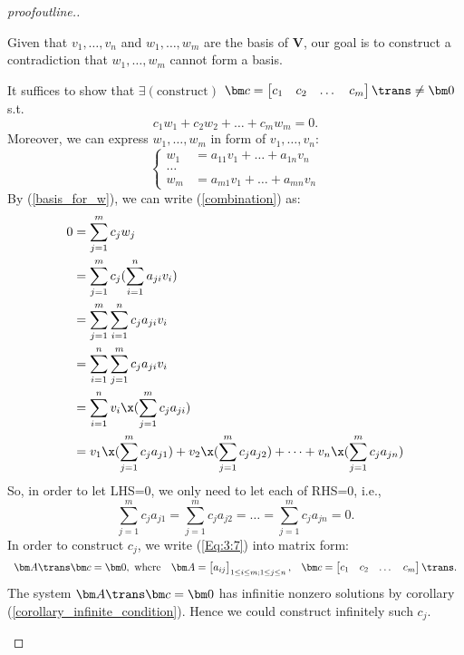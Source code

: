 \begin{proof}[proofoutline.]
\begin{enumerate}
Given that $v_1,\dots,v_n$ and $w_1,\dots,w_m$ are the basis of $\bm V$, our goal is to construct a contradiction that $w_1,\dots,w_m$ cannot form a basis.

It suffices to show that $\exists (\mbox{construct})$ $\bm c = \begin{bmatrix}
c_1&c_2&\dots&c_m
\end{bmatrix}\trans\ne\bm 0$ s.t.
\begin{equation}\label{combination}
c_1w_1+c_2w_2+\dots+c_mw_m = 0.
\end{equation}
Moreover, we can express $w_1,\dots,w_m$ in form of $v_1,\dots,v_n$:
\begin{equation}\label{basis_for_w}
\left\{\begin{aligned}
w_1 &= a_{11}v_1 +\dots+a_{1n}v_n\\
\dots\\
w_m &= a_{m1}v_1 +\dots + a_{mn}v_n
\end{aligned}\right.
\end{equation}
By (\ref{basis_for_w}), we can write (\ref{combination}) as:
\[
\begin{aligned}
0 &= \sum_{j=1}^{m}c_jw_j\\
  &= \sum_{j=1}^{m}c_j(\sum_{i=1}^{n}a_{ji}v_i)\\
  &= \sum_{j=1}^{m}\sum_{i=1}^{n}c_ja_{ji}v_i\\
  &= \sum_{i=1}^{n}\sum_{j=1}^{m}c_ja_{ji}v_i\\
  &= \sum_{i=1}^{n}v_i\x(\sum_{j=1}^{m}c_ja_{ji})\\
  &= v_1\x(\sum_{j=1}^{m}c_ja_{j1}) + v_2\x(\sum_{j=1}^{m}c_ja_{j2}) +\dots +v_n\x(\sum_{j=1}^{m}c_ja_{jn})
\end{aligned}
\]
So, in order to let LHS=0, we only need to let each of RHS=0, i.e., 
\begin{equation}
\sum_{j=1}^{m}c_ja_{j1} = \sum_{j=1}^{m}c_ja_{j2} = \dots = \sum_{j=1}^{m}c_ja_{jn} = 0.\label{Eq:3:7}
\end{equation}
In order to construct $c_j$, we write (\ref{Eq:3:7}) into matrix form:
\[
\begin{array}{lll}
\bm A\trans \bm c = \bm 0,
\mbox{ where}
&
\bm A = \begin{bmatrix}
a_{ij}
\end{bmatrix}_{1\le i\le m;1\le j\le n},
&
\bm c = \begin{bmatrix}
c_1&c_2&\dots&c_m
\end{bmatrix}\trans.
\end{array}
\]
The system $\bm A\trans \bm c = \bm 0$ has infinitie nonzero solutions by corollary (\ref{corollary_infinite_condition}). Hence we could construct infinitely such $c_j$.
\end{enumerate}
\end{proof}

